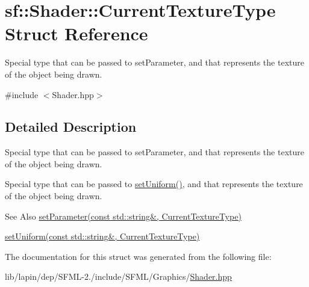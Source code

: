 \hypertarget{structsf_1_1_shader_1_1_current_texture_type}{\section{sf\-:\-:Shader\-:\-:Current\-Texture\-Type Struct Reference}
\label{structsf_1_1_shader_1_1_current_texture_type}
}


Special type that can be passed to set\-Parameter, and that represents the texture of the object being drawn.  




{\ttfamily \#include $<$Shader.\-hpp$>$}



\subsection{Detailed Description}
Special type that can be passed to set\-Parameter, and that represents the texture of the object being drawn. 

Special type that can be passed to \hyperlink{classsf_1_1_shader_abf78e3bea1e9b0bab850b6b0a0de29c7}{set\-Uniform()}, and that represents the texture of the object being drawn.

\begin{DoxySeeAlso}{See Also}
\hyperlink{classsf_1_1_shader_af06b4cba0bab915fa01032b063909044}{set\-Parameter(const std\-::string\&, Current\-Texture\-Type)}

\hyperlink{classsf_1_1_shader_ab18f531e1f726b88fec1cf5a1e6af26d}{set\-Uniform(const std\-::string\&, Current\-Texture\-Type)} 
\end{DoxySeeAlso}


The documentation for this struct was generated from the following file\-:\begin{DoxyCompactItemize}
\item 
lib/lapin/dep/\-S\-F\-M\-L-\/2./include/\-S\-F\-M\-L/\-Graphics/\hyperlink{lapin_2dep_2_s_f_m_l-2_83_2include_2_s_f_m_l_2_graphics_2_shader_8hpp}{Shader.\-hpp}\end{DoxyCompactItemize}
